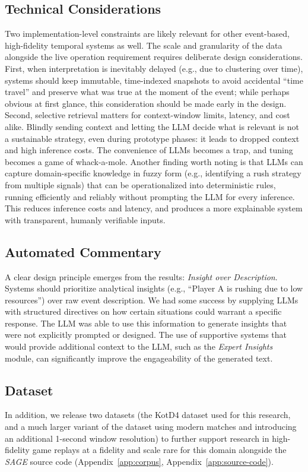 \subsection{Technical Considerations}
Two implementation-level constraints are likely relevant for other event-based, high-fidelity temporal systems as well. The scale and granularity of the data alongside the live operation requirement requires deliberate design considerations. First, when interpretation is inevitably delayed (e.g., due to clustering over time), systems should keep immutable, time-indexed snapshots to avoid accidental ``time travel'' and preserve what was true at the moment of the event; while perhaps obvious at first glance, this consideration should be made early in the design. Second, selective retrieval matters for context-window limits, latency, and cost alike. Blindly sending context and letting the LLM decide what is relevant is not a sustainable strategy, even during prototype phases: it leads to dropped context and high inference costs. The convenience of LLMs becomes a trap, and tuning becomes a game of whack-a-mole. Another finding worth noting is that LLMs can capture domain-specific knowledge in fuzzy form (e.g., identifying a rush strategy from multiple signals) that can be operationalized into deterministic rules, running efficiently and reliably without prompting the LLM for every inference. This reduces inference costs and latency, and produces a more explainable system with transparent, humanly verifiable inputs.

\subsection{Automated Commentary}
A clear design principle emerges from the results: \textit{Insight over Description}. Systems should prioritize analytical insights (e.g., ``Player A is rushing due to low resources'') over raw event description. We had some success by supplying LLMs with structured directives on how certain situations could warrant a specific response. The LLM was able to use this information to generate insights that were not explicitly prompted or designed. The use of supportive systems that would provide additional context to the LLM, such as the \textit{Expert Insights} module, can significantly improve the engageability of the generated text.

\subsection{Dataset}
In addition, we release two datasets (the KotD4 dataset used for this research, and a much larger variant of the dataset using modern matches and introducing an additional 1-second window resolution) to further support research in high-fidelity game replays at a fidelity and scale rare for this domain alongside the \textit{SAGE} source code (Appendix~\ref{app:corpus}, Appendix~\ref{app:source-code}).

